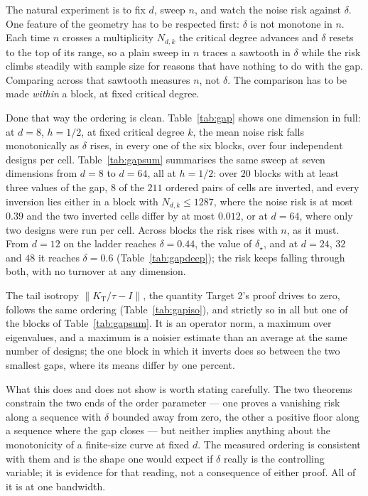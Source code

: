 \documentclass[11pt]{article}
\theoremstyle{definition}
\newcommand{\Kt}{K_{\mathrm{T}}}
\newcommand{\numGapBlocks}{20}
\newcommand{\numGapInv}{8}
\newcommand{\numGapInvDiffMax}{0.012}
\newcommand{\numGapInvNmax}{1287}
\newcommand{\numGapInvRiskMax}{0.39}
\newcommand{\numGapPairs}{211}
\begin{document}
The natural experiment is to fix $d$, sweep $n$, and watch the noise risk against $\delta$. One
feature of the geometry has to be respected first: $\delta$ is not monotone in $n$. Each time $n$
crosses a multiplicity $N_{d,k}$ the critical degree advances and $\delta$ resets to the top of its
range, so a plain sweep in $n$ traces a sawtooth in $\delta$ while the risk climbs steadily with
sample size for reasons that have nothing to do with the gap. Comparing across that sawtooth measures
$n$, not $\delta$. The comparison has to be made \emph{within} a block, at fixed critical degree.

Done that way the ordering is clean. Table~\ref{tab:gap} shows one dimension in full: at $d=8$,
$h=1/2$, at fixed critical degree $k$, the mean noise risk falls monotonically as $\delta$ rises, in
every one of the six blocks, over four independent designs per cell. Table~\ref{tab:gapsum}
summarises the same sweep at seven dimensions from $d=8$ to $d=64$, all at $h=1/2$: over
$\numGapBlocks$ blocks with at least three values of the gap, $\numGapInv$ of the $\numGapPairs$
ordered pairs of cells are inverted, and every inversion lies either in a block with
$N_{d,k}\le\numGapInvNmax$, where the noise risk is at most $\numGapInvRiskMax$ and the two inverted
cells differ by at most $\numGapInvDiffMax$, or at $d=64$, where only two designs were run per cell.
Across blocks the risk rises with $n$, as it must. From $d=12$ on the ladder reaches $\delta=0.44$, the value of $\delta_\star$, and at
$d=24$, $32$ and $48$ it reaches $\delta=0.6$ (Table~\ref{tab:gapdeep}); the risk keeps falling
through both, with no turnover at any dimension.

The tail isotropy $\|\Kt/\tau-I\|$, the quantity Target 2's proof drives to zero, follows the same
ordering (Table~\ref{tab:gapiso}), and strictly so in all but one of the blocks of
Table~\ref{tab:gapsum}. It is an operator norm, a maximum over eigenvalues, and a maximum is a
noisier estimate than an average at the same number of designs; the one block in which it inverts
does so between the two smallest gaps, where its means differ by one percent.

What this does and does not show is worth stating carefully. The two theorems constrain the two ends
of the order parameter --- one proves a vanishing risk along a sequence with $\delta$ bounded away
from zero, the other a positive floor along a sequence where the gap closes --- but neither implies
anything about the monotonicity of a finite-size curve at fixed $d$. The measured ordering is
consistent with them and is the shape one would expect if $\delta$ really is the controlling
variable; it is evidence for that reading, not a consequence of either proof. All of it is at one
bandwidth.
\end{document}
